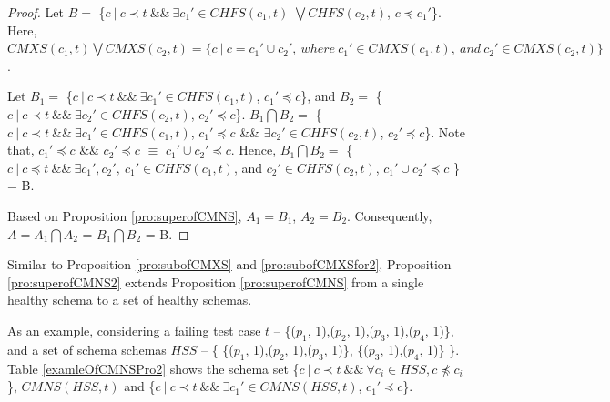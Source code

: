 {\begin{proof}
Let $B = $ \{$ c\ |\ c \prec t \ \&\&\  \exists c_{1}' \in CHFS(c_{1}, t)$ $ \bigvee CHFS(c_{2}, t)$, $c \preceq c_{1}'$\}. Here,    $ CMXS(c_{1}, t) \bigvee CMXS(c_{2}, t) = \{ c\ |\ c = c_{1}' \cup c_{2}',\ where\ c_{1}' \in CMXS(c_{1}, t),\ and\ c_{2}' \in CMXS(c_{2}, t) \}$.

Let $B_{1} = $ \{$ c\ |\ c \prec t \ \&\&\  \exists c_{1}' \in CHFS(c_{1}, t)$, $c_{1}' \preceq c$\}, and $B_{2} = $ \{$ c\ |\ c \prec t \ \&\&\  \exists c_{2}' \in CHFS(c_{2}, t)$, $c_{2}' \preceq c$\}. $B_{1} \bigcap B_{2} = $ \{$ c\ |\ c \prec t \ \&\&\  \exists c_{1}' \in CHFS(c_{1}, t)$, $c_{1}' \preceq c$ \&\& $\exists c_{2}' \in CHFS(c_{2}, t)$, $c_{2}' \preceq c$\}. Note that, $c_{1}' \preceq c $ \&\& $c_{2}' \preceq c$ $\equiv$ $c_{1}' \cup c_{2}' \preceq c$. Hence, $B_{1} \bigcap B_{2} = $ \{$ c\ |\ c \preceq t \ \&\&\  \exists c_{1}', c_{2}',\  c_{1}' \in CHFS(c_{1}, t)$, and $c_{2}' \in CHFS(c_{2}, t)$, $ c_{1}' \cup c_{2}' \preceq c$ \} = B.

Based on Proposition \ref{pro:superofCMNS}, $A_{1} = B_{1}$, $A_{2} = B_{2}$. Consequently,
$A = A_{1} \bigcap A_{2}$ = $B_{1} \bigcap B_{2}$  = B.


\end{proof}

Similar to Proposition \ref{pro:subofCMXS} and \ref{pro:subofCMXSfor2},  Proposition \ref{pro:superofCMNS2} extends Proposition \ref{pro:superofCMNS} from a single healthy schema to a set of healthy schemas.

As an example, considering a failing test case $t$ -- \{($p_{1}$, 1),($p_{2}$, 1),($p_{3}$, 1),($p_{4}$, 1)\}, and a set of schema schemas  $HSS$ -- \{ \{($p_{1}$, 1),($p_{2}$, 1),($p_{3}$, 1)\},  \{($p_{3}$, 1),($p_{4}$, 1)\} \}. Table \ref{examleOfCMNSPro2} shows the schema set \{$c\ |\ c \prec t\ \&\&\ \forall c_{i} \in HSS, c \npreceq c_{i} $\}, $CMNS(HSS, t)$ and \{$ c\ |\ c \prec t \ \&\& \ \exists c_{1}' \in CMNS(HSS, t)$, $c_{1}' \preceq c$\}.


}
